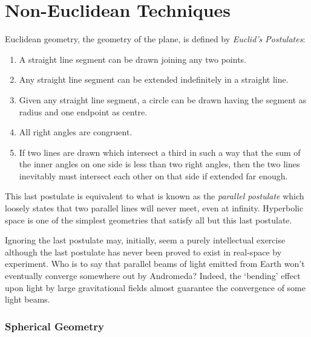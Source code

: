 \begin{savequote}
\end{savequote}

\chapter{Non-Euclidean Techniques}


Euclidean geometry, the geometry of the plane, is defined by \emph{Euclid's Postulates}:

\begin{enumerate}
\item A straight line segment can be drawn joining any two points. 
\item Any straight line segment can be extended indefinitely in a straight line. 
\item Given any straight line segment, a circle can be drawn having the segment as radius and one endpoint as centre. 
\item All right angles are congruent. 
\item If two lines are drawn which intersect a third in such a way that the sum of the inner angles on one side is less than two right angles, then the two lines inevitably must intersect each other on that side if extended far enough.
\end{enumerate} 

This last postulate is equivalent to what is known as the \emph{parallel postulate}
which loosely states that two parallel lines will never meet, even at infinity.
Hyperbolic space is one of the simplest geometries that satisfy all but this
last postulate.

Ignoring the last postulate may, initially, seem a purely intellectual exercise
although the last postulate has never been proved to exist in real-space
by experiment. Who is to say that parallel beams of light emitted from
Earth won't eventually converge somewhere out by Andromeda? Indeed, the 
`bending' effect upon light by large gravitational fields almost
guarantee the convergence of some light beams.

\subsection{Spherical Geometry}

